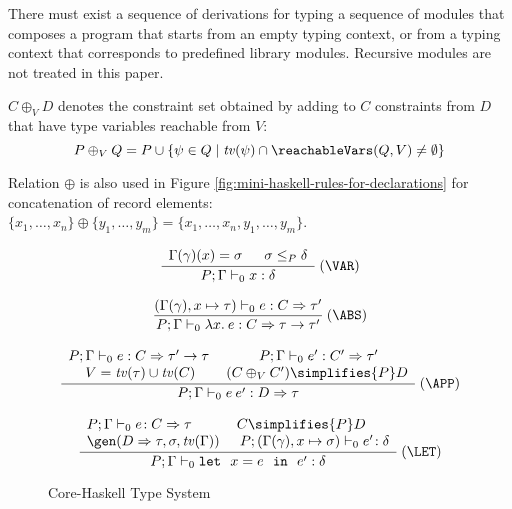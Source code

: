 
There must exist a sequence of derivations for typing a sequence of
modules that composes a program that starts from an empty typing
context, or from a typing context that corresponds to predefined
library modules. Recursive modules are not treated in this paper.

$C \oplus_V D$ denotes the constraint set obtained by adding to $C$
constraints from $D$ that have type variables reachable from $V$:
  \[ P \oplus_V Q = P \cup \{ \psi \in Q \mid \tv(\psi) \cap \reachableVars(Q,V) \not= \emptyset \} \]

Relation $\oplus$ is also used in Figure
\ref{fig:mini-haskell-rules-for-declarations} for concatenation of
record elements: $\{ x_1, \ldots, x_n \} \oplus \{ y_1, \ldots, y_m \}
= \{ x_1, \ldots, x_n, y_1, \ldots, y_m \}$.


\begin{figure}
\[ \begin{array}{cc}
      \displaystyle\frac
        {\begin{array}[t]{lll}
           \Gamma(\gamma)(x) = \sigma\ & \:\sigma \leq_P \delta
         \end{array}}
        {P;\Gamma \vdash_0 x: \delta} \:(\VAR) \\ \\

	\displaystyle\frac
          {(\Gamma(\gamma),x \mapsto \tau) \vdash_0 e: C \Rightarrow \tau'}
	  {P;\Gamma \vdash_0 \lambda x.\:e: C\Rightarrow \tau \rightarrow \tau'} \:(\ABS)  \\ \\

	\displaystyle\frac
	  {\begin{array}[t]{cc}
             P;\Gamma \vdash_0 e: C \Rightarrow \tau' \rightarrow \tau\: &\:
             P;\Gamma \vdash_0 e': C' \Rightarrow \tau' \\
             V = \tv(\tau) \cup \tv(C) & (C \oplus_V C') \simplifies{P} D
           \end{array}}
	{P;\Gamma \vdash_0 e\:e': D\Rightarrow \tau} \:(\APP) \\ \\

	\displaystyle\frac
	 {\begin{array}{ll}
            P;\Gamma \vdash_0 e\!:C \Rightarrow \tau & C \simplifies{P} D\\
             \gen(D\Rightarrow \tau,\sigma,\tv(\Gamma))\: & \:P;(\Gamma(\gamma),x \mapsto\sigma) \vdash_0 e'\!:\delta
          \end{array}}
	 {P;\Gamma \vdash_0 \mlet\ x=e\ \iin\ e':\delta} \:(\LET)
\end{array} \]
\caption{Core-Haskell Type System}
\label{fig:core-haskell-type-system}
\end{figure}

